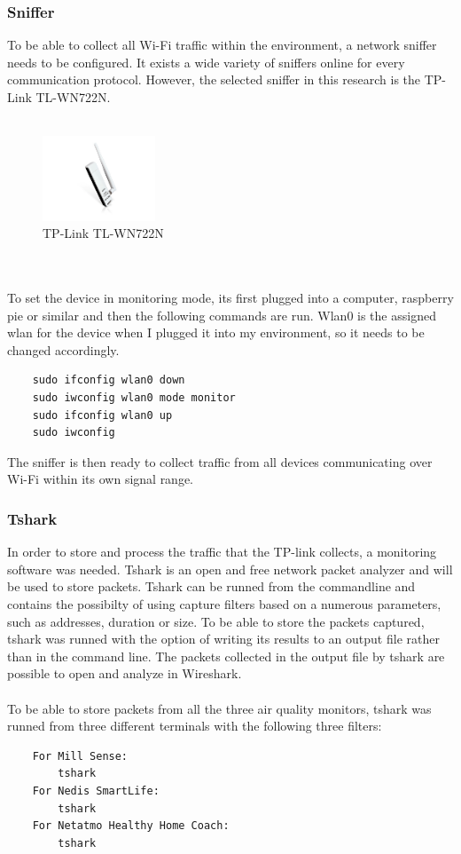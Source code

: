 \subsubsection{Sniffer}
To be able to collect all Wi-Fi traffic within the environment, a network sniffer needs to be configured. It exists a wide variety of sniffers online for every communication protocol. However, the selected sniffer in this research is the TP-Link TL-WN722N. 
\\\\
\begin{figure} [!ht]
    \centering
    \includegraphics[width=0.3\textwidth]{figures/Sniffer.jpg}
    \caption{TP-Link TL-WN722N \cite{Sniffer}}
    \label{fig:Sniffer}
\end{figure}
\\\\
To set the device in monitoring mode, its first plugged into a computer, raspberry pie or similar and then the following commands are run. Wlan0 is the assigned wlan for the device when I plugged it into my environment, so it needs to be changed accordingly. 
\begin{verbatim}
    sudo ifconfig wlan0 down
    sudo iwconfig wlan0 mode monitor
    sudo ifconfig wlan0 up
    sudo iwconfig
\end{verbatim}
The sniffer is then ready to collect traffic from all devices communicating over Wi-Fi within its own signal range. 
\subsubsection{Tshark}
In order to store and process the traffic that the TP-link collects, a monitoring software was needed. Tshark is an open and free network packet analyzer and will be used to store packets. Tshark can be runned from the commandline and contains the possibilty of using capture filters based on a numerous parameters, such as addresses, duration or size. To be able to store the packets captured, tshark was runned with the option of writing its results to an output file rather than in the command line. The packets collected in the output file by tshark are possible to open and analyze in Wireshark. 
\\\\
To be able to store packets from all the three air quality monitors, tshark was runned from three different terminals with the following three filters:
\begin{verbatim}
    For Mill Sense:
        tshark 
    For Nedis SmartLife:
        tshark
    For Netatmo Healthy Home Coach:
        tshark 
\end{verbatim}

